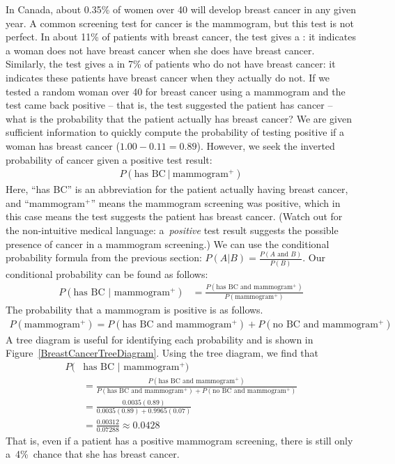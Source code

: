 \begin{examplewrap}
\begin{nexample}{In Canada, about 0.35\% of women over 40 will develop breast cancer in any given year. A common screening test for cancer is the mammogram, but this test is not perfect. In about 11\% of patients with breast cancer, the test gives a : it indicates a woman does not have breast cancer when she does have breast cancer. Similarly, the test gives a  in 7\% of patients who do not have breast cancer: it indicates these patients have breast cancer when they actually do not. If we tested a random woman over 40 for breast cancer using a mammogram and the test came back positive -- that is, the test suggested the patient has cancer -- what is the probability that the patient actually has breast cancer?}\label{probabilityOfBreastCancerGivenPositiveTestExample}
We are given sufficient information to quickly compute the probability of testing positive if a woman has breast cancer ($1.00 - 0.11 = 0.89$). However, we seek the inverted probability of cancer given a positive test result:
\begin{align*}
P(\text{has BC}\ |\ \text{mammogram$^+$})
\end{align*}
Here, ``has BC'' is an abbreviation for the patient actually having breast cancer, and ``mammogram$^+$'' means the mammogram screening was positive, which in this case means the test suggests the patient has breast cancer. (Watch out for the non-intuitive medical language: a~\emph{positive} test result suggests the possible presence of cancer in a mammogram screening.) We can use the conditional probability formula from the previous section: $P(A|B) = \frac{P(A \text{ and } B)}{P(B)}$. Our conditional probability can be found as follows:
\begin{align*}
P(\text{has BC $|$ mammogram$^+$}) &=  \frac{P(\text{has BC and mammogram$^+$})}{P(\text{mammogram$^+$})}
\end{align*}
The probability that a mammogram is positive is as follows.
\begin{align*}
P(\text{mammogram$^+$})=P(\text{has BC and mammogram$^+$}) +  P(\text{no BC and mammogram$^+$})
\end{align*}
A tree diagram is useful for identifying each probability and is shown in Figure~\ref{BreastCancerTreeDiagram}. Using the tree diagram, we find that
\begin{align*}
P(&\text{has BC $|$ mammogram$^+$}) \\
&= \frac{P(\text{has BC and mammogram$^+$})}{P(\text{has BC and mammogram$^+$}) +  P(\text{no BC and mammogram$^+$})} \\
&= \frac{0.0035(0.89)}{0.0035(0.89)+0.9965(0.07)}\\
&= \frac{0.00312}{0.07288}\approx 0.0428
\end{align*}
That is, even if a patient has a positive mammogram screening, there is still only a~4\%~chance that she has breast cancer.
\end{nexample}
\end{examplewrap}

